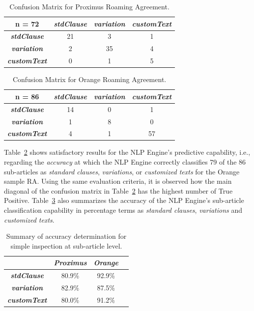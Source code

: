 \begin{table}[htbp]
\caption{Confusion Matrix for Proximus Roaming Agreement.}
\begin{center}
\begin{tabular}{|c|c|c|c|}
\hline
\textbf{n = 72} & \textbf{\textit{stdClause}}& \textbf{\textit{variation}}& \textbf{\textit{customText}} \\
\hline
\textbf{\textit{stdClause}}& 21 & 3 & 1 \\
\hline
\textbf{\textit{variation}}& 2 & 35 & 4 \\
\hline
\textbf{\textit{customText}}& 0 & 1 & 5 \\
\hline
\end{tabular}
\label{table1}
\end{center}
\end{table}

\begin{table}[htbp]
\caption{Confusion Matrix for Orange Roaming Agreement.}
\begin{center}
\begin{tabular}{|c|c|c|c|}
\hline
\textbf{n = 86} & \textbf{\textit{stdClause}}& \textbf{\textit{variation}}& \textbf{\textit{customText}} \\
\hline
\textbf{\textit{stdClause}}& 14 & 0 & 1 \\
\hline
\textbf{\textit{variation}}& 1 & 8 & 0 \\
\hline
\textbf{\textit{customText}}& 4 & 1 & 57 \\
\hline
\end{tabular}
\label{table2}
\end{center}
\end{table}

Table~\ref{table2} shows satisfactory results for the NLP Engine's predictive capability, i.e., regarding the \textit{accuracy} at which the NLP Engine correctly classifies 79 of the 86 sub-articles as \textit{standard clauses}, \textit{variations}, or \textit{customized texts} for the Orange sample RA. Using the same evaluation criteria, it is observed how the main diagonal of the confusion matrix in Table~\ref{table2} has the highest number of True Positive. Table~\ref{table3} also summarizes the accuracy of the NLP Engine's sub-article classification capability in percentage terms as \textit{standard clauses}, \textit{variations} and \textit{customized texts}.

\begin{table}[htbp]
\caption{Summary of accuracy determination for simple inspection at sub-article level.}
\begin{center}
\begin{tabular}{|c|c|c|c|}
\hline
\textbf{} & \textbf{\textit{Proximus}}& \textbf{\textit{Orange}} \\
\hline
\textbf{\textit{stdClause}}& 80.9\% & 92.9\% \\
\hline
\textbf{\textit{variation}}& 82.9\% & 87.5\% \\
\hline
\textbf{\textit{customText}}& 80.0\% & 91.2\% \\
\hline
\end{tabular}
\label{table3}
\end{center}
\end{table}

